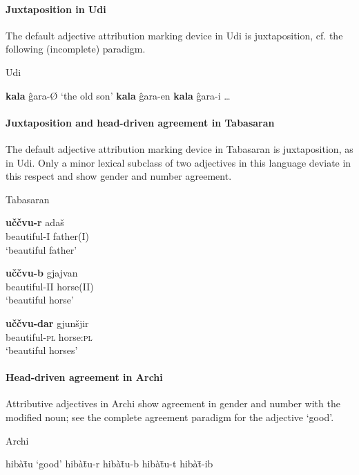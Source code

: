 \paragraph*{Juxtaposition in Udi}
The default adjective attribution marking device in Udi is juxtaposition, cf. the following (incomplete) paradigm.
\begin{exe}
\settowidth{}
\ex 
\rm{Udi \citep[465]{schulze-furhoff1994}}
\begin{xlist}
\ex \textbf{kala} ĝara-Ø	\rm{‘the old son’}	
\ex \textbf{kala} ĝara-en					
\ex \textbf{kala} ĝara-i					
\ex \dots
\end{xlist}
\end{exe}

\paragraph*{Juxtaposition and head\hyp{}driven agreement in Tabasaran}
The default adjective attribution marking device in Tabasaran is juxtaposition, as in Udi. Only a minor lexical subclass of two adjectives in this language deviate in this respect and show gender and number agreement.
\begin{exe}
\ex 
\rm{Tabasaran \citep[50–51]{kurbanov1986}}
\begin{xlist}
\ex 
\gll 	\textbf{uččvu-r} adaš\\
	beautiful-\textsc{I} father\textsc{(I)}\\
\glt	‘beautiful father’

\ex 
\gll	\textbf{uččvu-b} gjajvan\\
	beautiful-\textsc{II} horse\textsc{(II)}\\
\glt	‘beautiful horse’

\ex
\gll	\textbf{uččvu-dar} gjunšjir\\
	beautiful-\textsc{pl} horse:\textsc{pl}\\
\glt	‘beautiful horses’
\end{xlist}
\end{exe}

\paragraph*{Head\hyp{}driven agreement in Archi}
Attributive adjectives in Archi show agreement in gender and number with the modified noun; see the complete agreement paradigm for the adjective ‘good’.
\begin{exe}
\settowidth\jamwidth{[\textsc{IV sg}]}
\ex 
\rm{Archi \citep{kibrik1994a}}
\begin{xlist}
\ex	hibàt̄u	\rm{‘good’}	\jambox{\rm{[\textsc{I sg}]}}
\ex	hibàt̄u-r				\jambox{\rm{[\textsc{II sg}]}}
\ex	hibàt̄u-b				
\ex	hibàt̄u-t				\jambox{\rm{[\textsc{IV sg}]}}
\ex	hibàt̄-ib				\jambox{\rm{[\textsc{pl}]}}
\end{xlist}
\end{exe}

